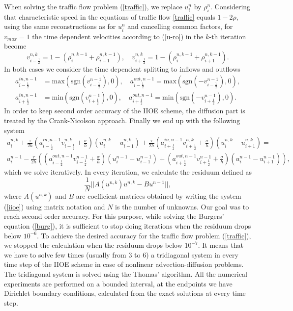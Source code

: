 \documentclass[../include.tex]{subfiles}
\begin{document}
When solving the traffic flow problem (\ref{traffic}), we replace $ u^n_i $ by $ \rho^n_i $. Considering that characteristic speed in the equations of traffic flow \eqref{traffic} equals $ 1-2\rho $, using the same reconstructions as for $ u^n_i $ and cancelling common factors, for $ v_{max} = 1 $ the time dependent velocities according to (\ref{u-ro}) in the $ k $-th iteration become
\[ v^{n,k}_{i-\frac{1}{2}} = 1 - (\rho^{n,k-1}_i + \rho^{n,k-1}_{i-1}),\quad
v^{n,k}_{i+\frac{1}{2}} = 1 - (\rho^{n,k-1}_i + \rho^{n,k-1}_{i+1}). \]
In both cases we consider the time dependent splitting to inflows and outflows
\begin{align}
	a^{in,n-1}_{i-\frac{1}{2}} &= \textrm{max}(\mathrm{sgn}(v^{n-1}_{i-\frac{1}{2}}),0),\quad 
	a^{out,n-1}_{i-\frac{1}{2}} = \textrm{max}(\mathrm{sgn}(-v^{n-1}_{i-\frac{1}{2}}),0), 
	\\
	a^{in,n-1}_{i+\frac{1}{2}} &= \textrm{min}(\mathrm{sgn}(v^{n-1}_{i+\frac{1}{2}}),0),\quad
	a^{out,n-1}_{i+\frac{1}{2}} = \textrm{min}(\mathrm{sgn}(-v^{n-1}_{i+\frac{1}{2}}),0). 
\end{align}
In order to keep second order accuracy of the IIOE scheme, the diffusion part is treated
by the Crank-Nicolson approach. Finally we end up with the following system
\begin{eqnarray}
	\label{iioe}
	u^{n,k}_i + \frac{\tau}{2h} \left(a^{in,n-1}_{i-\frac{1}{2}} v^{n,k}_{i-\frac{1}{2}} + \frac{\sigma}{h} \right) \left(u^{n,k}_i - u^{n,k}_{i-1}\right) + 
	\frac{\tau}{2h} \left(a^{in,n-1}_{i+\frac{1}{2}} v^{n,k}_{i+\frac{1}{2}} + \frac{\sigma}{h} \right) \left(u^{n,k}_i - u^{n,k}_{i+1}\right) = \\
	u^{n-1}_i - \frac{\tau}{2h} \left(\left(a^{out,n-1}_{i-\frac{1}{2}} v^{n-1}_{i-\frac{1}{2}}  + \frac{\sigma}{h} \right) \left(u^{n-1}_i - u^{n-1}_{i-1}\right) + 
	\left(a^{out,n-1}_{i+\frac{1}{2}} v^{n-1}_{i+\frac{1}{2}} + \frac{\sigma}{h} \right) \left(u^{n-1}_i - u^{n-1}_{i+1}\right)\right),\nonumber
\end{eqnarray}
which we solve iteratively. In every iteration, we calculate the residuum defined as
\[ \frac{1}{N}||A(u^{n,k})u^{n,k} - Bu^{n-1}||, \]
where $ A(u^{n,k}) $ and $ B $ are coefficient matrices obtained by writing the system (\ref{iioe}) using matrix notation and $ N $ is the number of unknowns. Our goal was to reach second order accuracy. For this purpose, while solving the Burgers' equation (\ref{burg}), it is sufficient to stop doing iterations when the residuum drops below $ 10^{-6} $. To achieve the desired accuracy for the traffic flow problem (\ref{traffic}), we stopped the calculation when the residuum drops below $ 10^{-7} $. It  means that we have to solve few times (usually from 3 to 6) a tridiagonal system in every time step of the IIOE scheme in case of nonlinear advection-diffusion problems. The tridiagonal system is solved using the Thomas' algorithm. All the numerical experiments are performed on a bounded interval, at the endpoints we have Dirichlet boundary conditions, calculated from the exact solutions at every time step.
\end{document}
